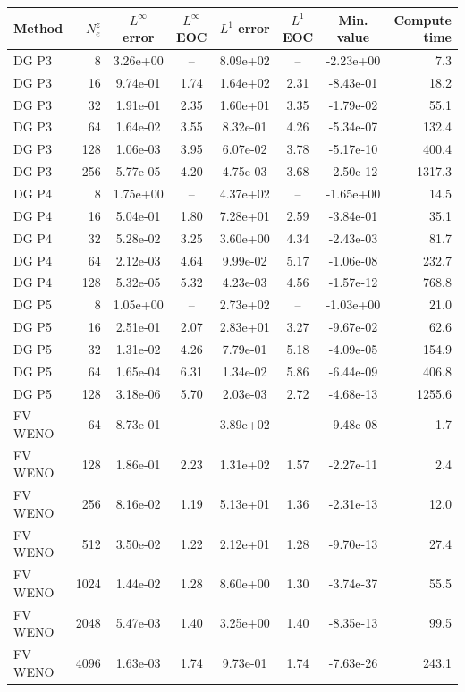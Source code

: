 \begin{tabular}{l r c c c c c r}
\toprule
Method & $N_e^z$ & $L^\infty$ error & $L^\infty$ EOC & $L^1$ error & $L^1$ EOC & Min. value & Compute time \\
\midrule
  DG P3 & 8 & 3.26e+00 & -- & 8.09e+02 & -- & -2.23e+00 & 7.3 \\
  DG P3 & 16 & 9.74e-01 & 1.74 & 1.64e+02 & 2.31 & -8.43e-01 & 18.2 \\
  DG P3 & 32 & 1.91e-01 & 2.35 & 1.60e+01 & 3.35 & -1.79e-02 & 55.1 \\
  DG P3 & 64 & 1.64e-02 & 3.55 & 8.32e-01 & 4.26 & -5.34e-07 & 132.4 \\
  DG P3 & 128 & 1.06e-03 & 3.95 & 6.07e-02 & 3.78 & -5.17e-10 & 400.4 \\
  DG P3 & 256 & 5.77e-05 & 4.20 & 4.75e-03 & 3.68 & -2.50e-12 & 1317.3 \\
\midrule
  DG P4 & 8 & 1.75e+00 & -- & 4.37e+02 & -- & -1.65e+00 & 14.5 \\
  DG P4 & 16 & 5.04e-01 & 1.80 & 7.28e+01 & 2.59 & -3.84e-01 & 35.1 \\
  DG P4 & 32 & 5.28e-02 & 3.25 & 3.60e+00 & 4.34 & -2.43e-03 & 81.7 \\
  DG P4 & 64 & 2.12e-03 & 4.64 & 9.99e-02 & 5.17 & -1.06e-08 & 232.7 \\
  DG P4 & 128 & 5.32e-05 & 5.32 & 4.23e-03 & 4.56 & -1.57e-12 & 768.8 \\
\midrule
  DG P5 & 8 & 1.05e+00 & -- & 2.73e+02 & -- & -1.03e+00 & 21.0 \\
  DG P5 & 16 & 2.51e-01 & 2.07 & 2.83e+01 & 3.27 & -9.67e-02 & 62.6 \\
  DG P5 & 32 & 1.31e-02 & 4.26 & 7.79e-01 & 5.18 & -4.09e-05 & 154.9 \\
  DG P5 & 64 & 1.65e-04 & 6.31 & 1.34e-02 & 5.86 & -6.44e-09 & 406.8 \\
  DG P5 & 128 & 3.18e-06 & 5.70 & 2.03e-03 & 2.72 & -4.68e-13 & 1255.6 \\
\midrule
  FV WENO & 64 & 8.73e-01 & -- & 3.89e+02 & -- & -9.48e-08 & 1.7 \\
  FV WENO & 128 & 1.86e-01 & 2.23 & 1.31e+02 & 1.57 & -2.27e-11 & 2.4 \\
  FV WENO & 256 & 8.16e-02 & 1.19 & 5.13e+01 & 1.36 & -2.31e-13 & 12.0 \\
  FV WENO & 512 & 3.50e-02 & 1.22 & 2.12e+01 & 1.28 & -9.70e-13 & 27.4 \\
  FV WENO & 1024 & 1.44e-02 & 1.28 & 8.60e+00 & 1.30 & -3.74e-37 & 55.5 \\
  FV WENO & 2048 & 5.47e-03 & 1.40 & 3.25e+00 & 1.40 & -8.35e-13 & 99.5 \\
  FV WENO & 4096 & 1.63e-03 & 1.74 & 9.73e-01 & 1.74 & -7.63e-26 & 243.1 \\
\bottomrule
\end{tabular}
